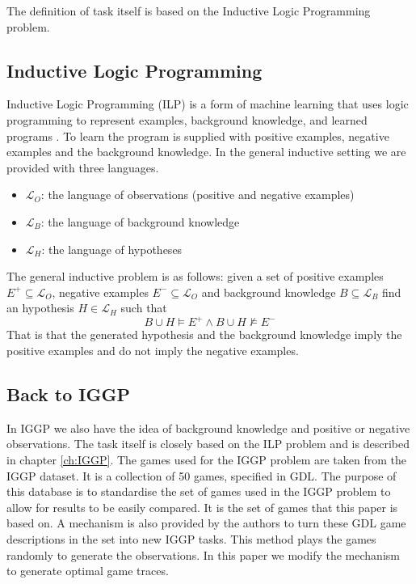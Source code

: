 The definition of task itself is based on the Inductive Logic Programming problem.

\subsection{Inductive Logic Programming}\label{sec:ILP}
Inductive Logic Programming (ILP) is a form of machine learning that uses logic programming to represent examples, background knowledge, and learned programs \cite{Cropper/EfficientLearning}. To learn the program is supplied with positive examples, negative examples and the background knowledge. In the general inductive setting we are provided with three languages.
\begin{itemize}
\item $\mathcal{L}_O$: the language of observations (positive and negative examples)
\item $\mathcal{L}_B$: the language of background knowledge
\item $\mathcal{L}_H$: the language of hypotheses
\end{itemize}
The general inductive problem is as follows: given a set of positive examples $E^+ \subseteq \mathcal{L}_O$, negative examples $E^- \subseteq \mathcal{L}_O$ and  background knowledge $B \subseteq \mathcal{L}_B$ find an hypothesis $H \in \mathcal{L}_H$ such that 
\[B \cup H \models E^+ \wedge B \cup H \not\models E^-\]
\cite{Muggleton/ILP}
That is that the generated hypothesis and the background knowledge imply the positive examples and do not imply the negative examples.


\subsection{Back to IGGP}

In IGGP we also have the idea of background knowledge and positive or negative observations. The task itself is closely based on the ILP problem and is described in chapter \ref{ch:IGGP}. The games used for the IGGP problem are taken from the IGGP dataset. It is a collection of 50 games, specified in GDL. The purpose of this database is to standardise the set of games used in the IGGP problem to allow for results to be easily compared. It is the set of games that this paper is based on.
A mechanism is also provided by the authors to turn these GDL game descriptions in the set into new IGGP tasks. This method plays the games randomly to generate the observations. In this paper we modify the mechanism to generate optimal game traces.


